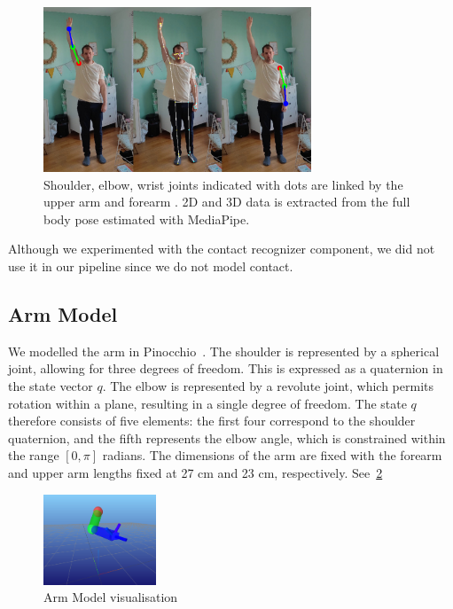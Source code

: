 \begin{figure}
    \centering
    \includegraphics[width=8cm]{figures/pose_detection_mediapipe_collage.png}
    \caption{
    \color{red}Shoulder, \color{darkgreen}elbow, \color{blue}wrist \color{black} joints indicated with dots
    are linked by the \color{darkgreen}upper arm \color{black} and \color{blue}forearm \color{black}. 2D and 3D data is extracted from
    the full body pose estimated with MediaPipe.
    }
    \label{fig:mediapipe}
\end{figure}

Although we experimented with the contact recognizer component, we did not use it in our pipeline since we do not model contact.

\subsection{Arm Model}
\label{subsec:arm_model}

We modelled the arm in Pinocchio~\cite{carpentier2019pinocchio}. The shoulder is represented by a spherical joint, allowing for three degrees 
of freedom. This is expressed as a quaternion in the state vector \(q\). The elbow is represented by a revolute joint, which permits rotation 
within a plane, resulting in a single degree of freedom. The state \(q\) therefore consists of five elements: the first four correspond to the 
shoulder quaternion, and the fifth represents the elbow angle, which is constrained within the range \([0, \pi]\) radians. The dimensions of 
the arm are fixed with the forearm and upper arm lengths fixed at 27 cm and 23 cm, respectively. See~\cref{fig:arm_model}

\begin{figure}
    \centering
    \includegraphics[width=0.3\textwidth]{figures/live_arm.png}
    \caption{Arm Model visualisation}
    \label{fig:arm_model}
\end{figure}

